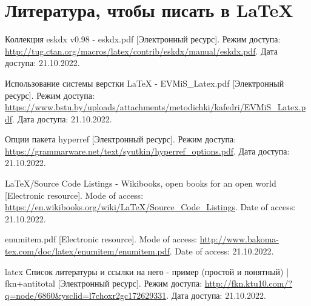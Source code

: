 \begingroup
  \section*{Литература, чтобы писать в \LaTeX}

  \renewcommand{\addcontentsline}[3]{}%
  \renewcommand{\section}[2]{}%

  \begin{thebibliography}{}
    Коллекция eskdx v0.98 - eskdx.pdf
    [Электронный ресурс].
    Режим доступа: \url{http://tug.ctan.org/macros/latex/contrib/eskdx/manual/eskdx.pdf}.
    Дата доступа: 21.10.2022.
  
    Использование системы верстки LaTeX - EVMiS\_Latex.pdf
    [Электронный ресурс].
    Режим доступа: \url{https://www.bstu.by/uploads/attachments/metodichki/kafedri/EVMiS_Latex.pdf}.
    Дата доступа: 21.10.2022.
  
    Опции пакета hyperref
    [Электронный ресурс].
    Режим доступа: \url{https://grammarware.net/text/syutkin/hyperref_options.pdf}.
    Дата доступа: 21.10.2022.
  
    LaTeX/Source Code Listings - Wikibooks, open books for an open world
    [Electronic resource].
    Mode of access: \url{https://en.wikibooks.org/wiki/LaTeX/Source_Code_Listings}.
    Date of access: 21.10.2022.
  
    enumitem.pdf
    [Electronic resource].
    Mode of access: \url{http://www.bakoma-tex.com/doc/latex/enumitem/enumitem.pdf}.
    Date of access: 21.10.2022.
  
    latex Список литературы и ссылки на него - пример (простой и понятный) | fkn+antitotal
    [Электронный ресурс].
    Режим доступа: \url{http://fkn.ktu10.com/?q=node/6860&ysclid=l7choxr2gc172629331}.
    Дата доступа: 21.10.2022.
  \end{thebibliography}
\endgroup

\newpage
